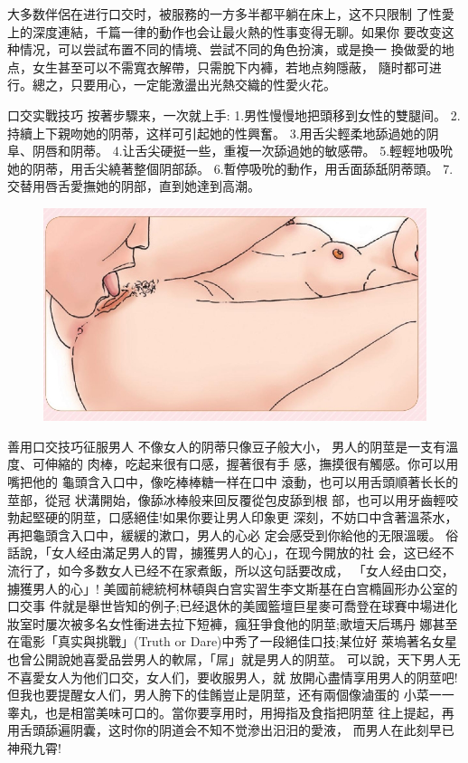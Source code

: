 \documentclass[12pt,UTF8]{ctexbook}
\begin{document}
大多数伴侶在进行口交时，被服務的一方多半都平躺在床上，这不只限制
了性愛上的深度連結，千篇一律的動作也会让最火熱的性事变得无聊。如果你
要改变这种情况，可以尝試布置不同的情境、尝試不同的角色扮演，或是換一
換做愛的地点，女生甚至可以不需寬衣解帶，只需脫下内褲，若地点夠隱蔽，
隨时都可进行。總之，只要用心，一定能激盪出光熱交織的性愛火花。

口交实戰技巧
按著步驟来，一次就上手:
1.男性慢慢地把頭移到女性的雙腿间。
2.持續上下親吻她的阴蒂，这样可引起她的性興奮。
3.用舌尖輕柔地舔過她的阴阜、阴唇和阴蒂。
4.让舌尖硬挺一些，重複一次舔過她的敏感帶。
5.輕輕地吸吮她的阴蒂，用舌尖繞著整個阴部舔。
6.暫停吸吮的動作，用舌面舔舐阴蒂頭。
7.交替用唇舌愛撫她的阴部，直到她達到高潮。

\begin{figure}[htbp]
	\centering
	\includegraphics[width=0.7\linewidth]{19}
	\caption{}
	\label{fig:1}
\end{figure}

善用口交技巧征服男人
不像女人的阴蒂只像豆子般大小，
男人的阴莖是一支有溫度、可伸縮的
肉棒，吃起来很有口感，握著很有手
感，撫摸很有觸感。你可以用嘴把他的
龜頭含入口中，像吃棒棒糖一样在口中
滾動，也可以用舌頭順著长长的莖部，從冠
状溝開始，像舔冰棒般来回反覆從包皮舔到根
部，也可以用牙齒輕咬勃起堅硬的阴莖，口感絕佳!如果你要让男人印象更
深刻，不妨口中含著溫茶水，再把龜頭含入口中，緩緩的漱口，男人的心必
定会感受到你給他的无限溫暖。
俗話說，「女人经由滿足男人的胃，擄獲男人的心」，在现今開放的社
会，这已经不流行了，如今多数女人已经不在家煮飯，所以这句話要改成，
「女人经由口交，擄獲男人的心」!
美國前總統柯林頓與白宫实習生李文斯基在白宫橢圓形办公室的口交事
件就是舉世皆知的例子;已经退休的美國籃壇巨星麥可喬登在球賽中場进化妝室时屢次被多名女性衝进去拉下短褲，瘋狂爭食他的阴莖;歌壇天后瑪丹
娜甚至在電影「真实與挑戰」(Truth or Dare)中秀了一段絕佳口技;某位好
萊塢著名女星也曾公開說她喜愛品尝男人的軟屌，「屌」就是男人的阴莖。
可以說，天下男人无不喜愛女人为他们口交，女人们，要收服男人，就
放開心盡情享用男人的阴莖吧!
但我也要提醒女人们，男人胯下的佳餚豈止是阴莖，还有兩個像滷蛋的
小菜一一睾丸，也是相當美味可口的。當你要享用时，用拇指及食指把阴莖
往上提起，再用舌頭舔遍阴囊，这时你的阴道会不知不觉滲出汨汨的愛液，
而男人在此刻早已神飛九霄!
\end{document}
